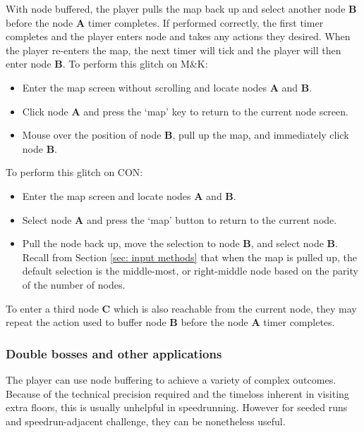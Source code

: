 \documentclass[12pt]{amsart}
\newcommand{\mk}{\textsf{M\&K}}
\newcommand{\con}{\textsf{CON}}
\begin{document}
With node  buffered, the player pulls the map back up and select another node \textbf{B} before the node \textbf{A} timer completes.  
If performed correctly, the first timer completes and the player enters node  and takes any actions they desired.  
When the player re-enters the map, the next timer will tick and the player will then enter node \textbf{B}.  
To perform this glitch on \mk:  
\begin{itemize}
    \item 
        Enter the map screen without scrolling and locate nodes \textbf{A} and \textbf{B}.  
    \item 
        Click node \textbf{A} and press the `map' key to return to the current node screen.  
    \item 
        Mouse over the position of node \textbf{B}, pull up the map, and immediately click node \textbf{B}. 
\end{itemize}
To perform this glitch on \con: 
\begin{itemize}
    \item 
        Enter the map screen and locate nodes \textbf{A} and \textbf{B}.  
    \item 
        Select node \textbf{A} and press the `map' button to return to the current node.  
    \item 
        Pull the node back up, move the selection to node \textbf{B}, and select node \textbf{B}.  
        Recall from Section \ref{sec: input methods} that when the map is pulled up, the default selection is the middle-most, or right-middle node based on the parity of the number of nodes.  
\end{itemize}
To enter a third node \textbf{C} which is also reachable from the current node, they may repeat the action used to buffer node \textbf{B} before the node \textbf{A} timer completes.  

\subsubsection{Double bosses and other applications}\label{sub-sub-sec: other applications}
The player can use node buffering to achieve a variety of complex outcomes.  
Because of the technical precision required and the timeloss inherent in visiting extra floors, this is usually unhelpful in speedrunning.  
However for seeded runs and speedrun-adjacent challenge, they can be nonetheless useful.  
\\
\end{document}
